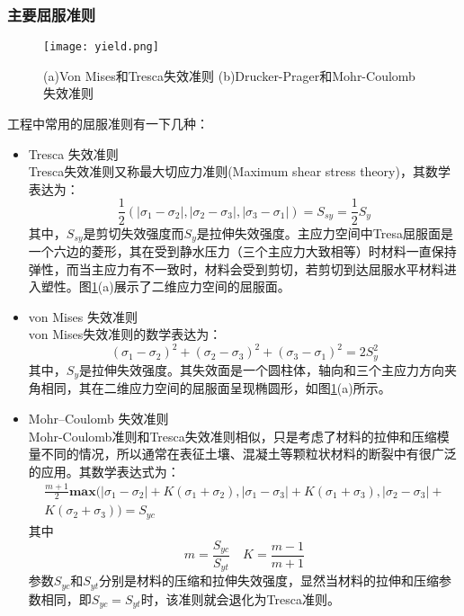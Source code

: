 \subsubsection{主要屈服准则}
\begin{figure}
\centering   
\texttt{[image: yield.png]}
\caption{(a)Von Mises和Tresca失效准则 (b)Drucker-Prager和Mohr-Coulomb失效准则} 
\label{fig:yield}
\end{figure}
工程中常用的屈服准则有一下几种\cite{Jagab2005Theory}：
\begin{itemize}
	\item Tresca 失效准则\\
	Tresca失效准则又称最大切应力准则(Maximum shear stress theory)，其数学表达为：
	\begin{equation}
	\frac{1}{2}\left(|\sigma_1-\sigma_2|,|\sigma_2-\sigma_3|,|\sigma_3-\sigma_1|\right)=S_{sy}=\frac{1}{2}S_y
	\end{equation}
	其中，$S_{sy}$是剪切失效强度而$S_y$是拉伸失效强度。主应力空间中Tresa屈服面是一个六边的菱形，其在受到静水压力（三个主应力大致相等）时材料一直保持弹性，而当主应力有不一致时，材料会受到剪切，若剪切到达屈服水平材料进入塑性。图\ref{fig:yield}(a)展示了二维应力空间的屈服面。
	\item von Mises 失效准则\\
	von Mises失效准则的数学表达为：
	\begin{equation}
	(\sigma_1 - \sigma_2)^2 + (\sigma_2 -\sigma_3)^2 + (\sigma_3-\sigma_1)^2 = 2S^2_y
	\end{equation}
	其中，$S_y$是拉伸失效强度。其失效面是一个圆柱体，轴向和三个主应力方向夹角相同，其在二维应力空间的屈服面呈现椭圆形，如图\ref{fig:yield}(a)所示。
	\item Mohr–Coulomb 失效准则\\
	Mohr-Coulomb准则和Tresca失效准则相似，只是考虑了材料的拉伸和压缩模量不同的情况，所以通常在表征土壤、混凝土等颗粒状材料的断裂中有很广泛的应用。其数学表达式为：
	\begin{multline}
	\frac{m+1}{2} \mathbf{max} \Big(|\sigma_1 - \sigma_2| + K(\sigma_1+\sigma_2),|\sigma_1 - \sigma_3| + K(\sigma_1+\sigma_3),|\sigma_2 - \sigma_3| + \\
	K(\sigma_2+\sigma_3)\Big) = S_{yc}
	\end{multline}  
	其中
	\begin{equation}
	m = \frac{S_{yc}}{S_{yt}}
 \quad K=\frac{m-1}{m+1}
 	\end{equation}
 	参数$S_{yc}$和$S_{yt}$分别是材料的压缩和拉伸失效强度，显然当材料的拉伸和压缩参数相同，即$S_{yc}=S_{yt}$时，该准则就会退化为Tresca准则。

\end{itemize}

